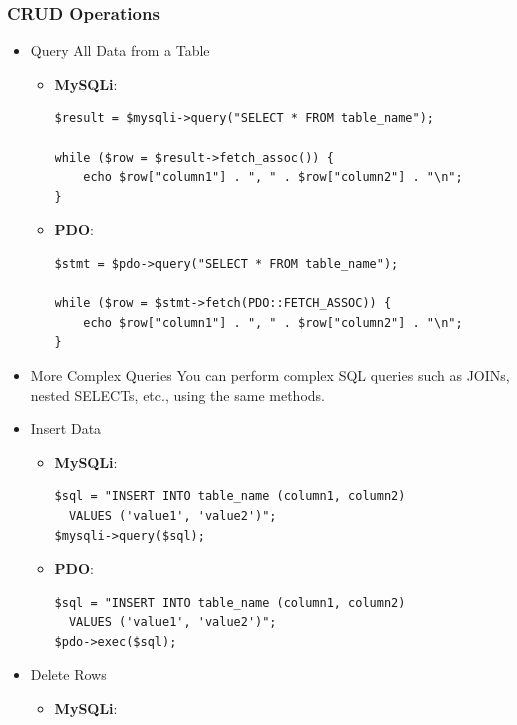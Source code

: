 \documentclass[11pt]{article}
\begin{document}
\subsubsection{CRUD Operations}
\label{sec:org9e337bf}
\begin{itemize}
\item Query All Data from a Table
\label{sec:org42ac7f1}
\begin{itemize}
\item \textbf{MySQLi}:

\begin{verbatim}
$result = $mysqli->query("SELECT * FROM table_name");

while ($row = $result->fetch_assoc()) {
    echo $row["column1"] . ", " . $row["column2"] . "\n";
}
\end{verbatim}

\item \textbf{PDO}:

\begin{verbatim}
$stmt = $pdo->query("SELECT * FROM table_name");

while ($row = $stmt->fetch(PDO::FETCH_ASSOC)) {
    echo $row["column1"] . ", " . $row["column2"] . "\n";
}
\end{verbatim}
\end{itemize}

\item More Complex Queries
\label{sec:orgb411ebf}
You can perform complex SQL queries such as JOINs, nested SELECTs, etc.,
using the same methods.

\item Insert Data
\label{sec:org2b353e3}
\begin{itemize}
\item \textbf{MySQLi}:

\begin{verbatim}
$sql = "INSERT INTO table_name (column1, column2)
  VALUES ('value1', 'value2')";
$mysqli->query($sql);
\end{verbatim}

\item \textbf{PDO}:

\begin{verbatim}
$sql = "INSERT INTO table_name (column1, column2)
  VALUES ('value1', 'value2')";
$pdo->exec($sql);
\end{verbatim}
\end{itemize}

\item Delete Rows
\label{sec:orgaefc8f3}
\begin{itemize}
\item \textbf{MySQLi}:


\end{itemize}
\end{itemize}
\end{document}
